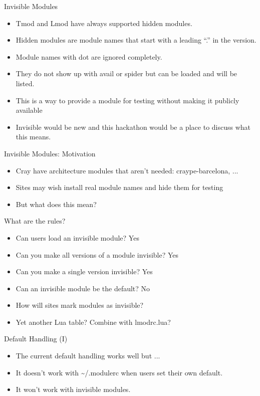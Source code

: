 \documentclass{beamer}
\begin{document}
\begin{frame}{Invisible Modules}
  \begin{itemize}
    \item Tmod and Lmod have always supported hidden modules.
    \item Hidden modules are module names that start with a leading
      ``.'' in the version.
    \item Module names with dot are ignored completely.
    \item They do not show up with avail or spider but can be loaded
      and will be listed.  
    \item This is a way to provide a module for testing without making
      it publicly available
    \item Invisible would be new and this hackathon would be a place
      to discuss what this means.
  \end{itemize}
\end{frame}

\begin{frame}{Invisible Modules: Motivation}
  \begin{itemize}
    \item Cray have architecture modules that aren't needed:
      craype-barcelona, ...
    \item Sites may wish install real module names and hide them for
      testing
    \item But what does this mean?
  \end{itemize}
\end{frame}

\begin{frame}{What are the rules?}
  \begin{itemize}
    \item Can users load an invisible module? Yes
    \item Can you make all versions of a module invisible?  Yes
    \item Can you make a single version invisible? Yes
    \item Can an invisible module be the default?  No
    \item How will sites mark modules as invisible?
    \item Yet another Lua table? Combine with lmodrc.lua?
  \end{itemize}
\end{frame}

\begin{frame}{Default Handling (I)}
  \begin{itemize}
    \item The current default handling works well but ...
    \item It doesn't work with \textasciitilde/.modulerc when users set their own
      default.
    \item It won't work with invisible modules.
  \end{itemize}
\end{frame}
\end{document}
